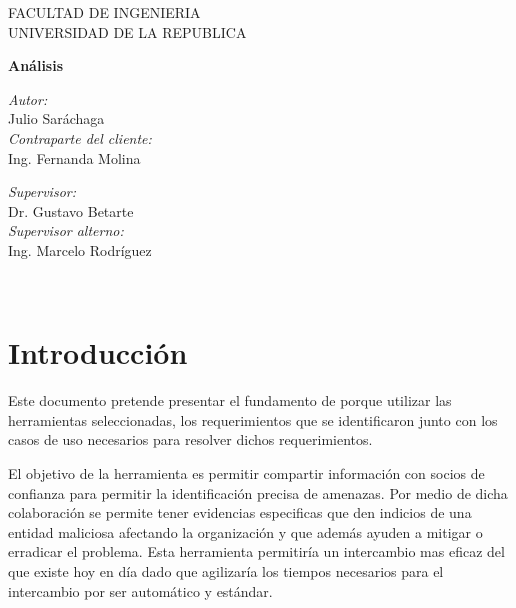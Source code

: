 \documentclass[11pt]{article}
\title{}
\begin{document}
  
   \begin{titlepage}

\begin{center}
\vspace*{-1in}

FACULTAD DE INGENIERIA\\
\vspace*{0.15in}
UNIVERSIDAD DE LA REPUBLICA \\
\vspace*{0.6in}
\vspace*{0.2in}
\begin{Large}
\textbf{Análisis} \\
\end{Large}
\vspace*{0.3in}
\end{center}

\begin{minipage}{0.4\textwidth}
\begin{flushleft} \large
\emph{Autor:}\\
Julio Saráchaga\\
\bigskip
\emph{Contraparte del cliente:}\\
Ing. Fernanda Molina
\end{flushleft}
\end{minipage}
\begin{minipage}{0.4\textwidth}
\begin{flushright} \large
\emph{Supervisor:} \\
Dr. Gustavo Betarte\\
\bigskip
\emph{Supervisor alterno:} \\
Ing. Marcelo Rodríguez
\end{flushright}
\end{minipage}\\[3cm]

\end{titlepage}
  
\clearpage\setcounter{page}{1}\section[Introducción]{Introducción}
Este documento pretende presentar el fundamento de porque utilizar las herramientas seleccionadas, los requerimientos que se identificaron junto con los casos de uso necesarios para resolver dichos requerimientos.

El objetivo de la herramienta es permitir compartir información con socios de confianza para permitir la identificación precisa de amenazas. Por medio de dicha colaboración se permite tener evidencias especificas que den indicios de una entidad maliciosa afectando la organización y que además ayuden a mitigar o erradicar el problema.
Esta herramienta permitiría un intercambio mas eficaz del que existe hoy en día dado que agilizaría los tiempos necesarios para el intercambio por ser automático y estándar.
\end{document}

